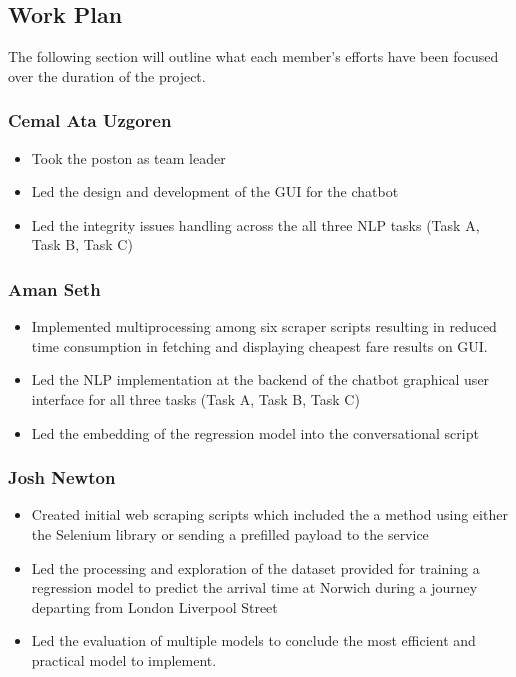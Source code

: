 \subsection{Work Plan}
The following section will outline what each member's efforts have been focused over the duration of the project.
\subsubsection{Cemal Ata Uzgoren}
\begin{itemize}
    \item Took the poston as team leader
    \item Led the design and development of the GUI for the chatbot
    \item Led the integrity issues handling across the all three NLP tasks (Task A, Task B, Task C)
\end{itemize}
\subsubsection{Aman Seth}
\begin{itemize}
    \item Implemented multiprocessing among six scraper scripts resulting in reduced time consumption in fetching and displaying cheapest fare results on GUI.
    \item Led the NLP implementation at the backend of the chatbot graphical user interface for all three tasks (Task A, Task B, Task C)
    \item Led the embedding of the regression model into the conversational script
    
\end{itemize}
\subsubsection{Josh Newton}
\begin{itemize}
    \item Created initial web scraping scripts which included the a method using either the Selenium library or sending a prefilled payload to the service
    \item Led the processing and exploration of the dataset provided for training a regression model to predict the arrival time at Norwich during a journey departing from London Liverpool Street
    \item Led the evaluation of multiple models to conclude the most efficient and practical model to implement.
\end{itemize} 

